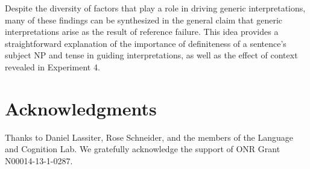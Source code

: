 \documentclass[10pt,letterpaper]{article}
\begin{document}
Despite the diversity of factors that play a role in driving generic interpretations, many of these findings can be synthesized in the general claim that generic interpretations arise as the result of reference failure. This idea provides a straightforward explanation of the importance of definiteness of a sentence's subject NP and tense in guiding interpretations, as well as the effect of context revealed in Experiment 4.   

\section{Acknowledgments}

Thanks to Daniel Lassiter, Rose Schneider, and the members of the Language and Cognition Lab. We gratefully acknowledge the support of ONR Grant N00014-13-1-0287.



\setlength{\bibleftmargin}{.125in}
\setlength{\bibindent}{-\bibleftmargin}


\end{document}
